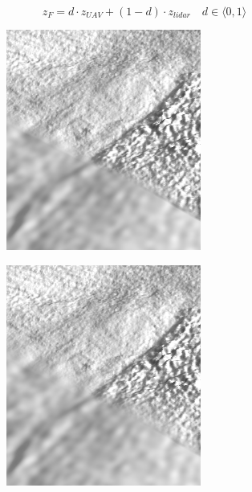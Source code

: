 \documentclass[a4paper,10pt]{article}
\begin{document}
$$z_F = d \cdot z_{UAV} + (1 - d) \cdot z_{lidar}\quad d\in \langle0, 1\rangle$$


\begin{figure}[bc]
	\centering
	\begin{subfigure}[b]{0.33\textwidth}
 		\includegraphics[width=\textwidth]{img/sm1}
	\end{subfigure}\hfill%
	\begin{subfigure}[b]{0.33\textwidth}
		\includegraphics[width=\textwidth]{img/sm2}

\end{subfigure}
\end{figure}
\end{document}
